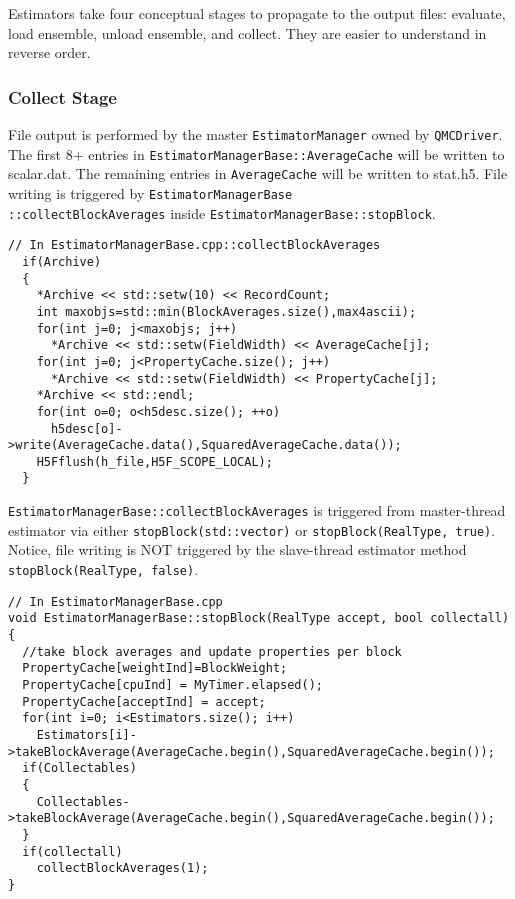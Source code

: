 Estimators take four conceptual stages to propagate to the output files: evaluate, load ensemble, unload ensemble, and collect. They are easier to understand in reverse order.

\subsubsection{Collect Stage}
File output is performed by the master \verb|EstimatorManager| owned by \verb|QMCDriver|. The first 8+ entries in \verb|EstimatorManagerBase::AverageCache| will be written to scalar.dat. The remaining entries in \verb|AverageCache| will be written to stat.h5. File writing is triggered by \verb|EstimatorManagerBase|\\ \verb|::collectBlockAverages| inside \verb|EstimatorManagerBase::stopBlock|.

\begin{lstlisting}
// In EstimatorManagerBase.cpp::collectBlockAverages
  if(Archive)
  {
    *Archive << std::setw(10) << RecordCount;
    int maxobjs=std::min(BlockAverages.size(),max4ascii);
    for(int j=0; j<maxobjs; j++)
      *Archive << std::setw(FieldWidth) << AverageCache[j];
    for(int j=0; j<PropertyCache.size(); j++)
      *Archive << std::setw(FieldWidth) << PropertyCache[j];
    *Archive << std::endl;
    for(int o=0; o<h5desc.size(); ++o)
      h5desc[o]->write(AverageCache.data(),SquaredAverageCache.data());
    H5Fflush(h_file,H5F_SCOPE_LOCAL);
  }
\end{lstlisting}

\verb|EstimatorManagerBase::collectBlockAverages| is triggered from master-thread estimator via either \verb|stopBlock(std::vector)| or \verb|stopBlock(RealType, true)|. Notice, file writing is NOT triggered by the slave-thread estimator method \verb|stopBlock(RealType, false)|.

\begin{lstlisting}
// In EstimatorManagerBase.cpp
void EstimatorManagerBase::stopBlock(RealType accept, bool collectall)
{
  //take block averages and update properties per block
  PropertyCache[weightInd]=BlockWeight;
  PropertyCache[cpuInd] = MyTimer.elapsed();
  PropertyCache[acceptInd] = accept;
  for(int i=0; i<Estimators.size(); i++)
    Estimators[i]->takeBlockAverage(AverageCache.begin(),SquaredAverageCache.begin());
  if(Collectables)
  { 
    Collectables->takeBlockAverage(AverageCache.begin(),SquaredAverageCache.begin());
  }
  if(collectall)
    collectBlockAverages(1);
}
\end{lstlisting}

